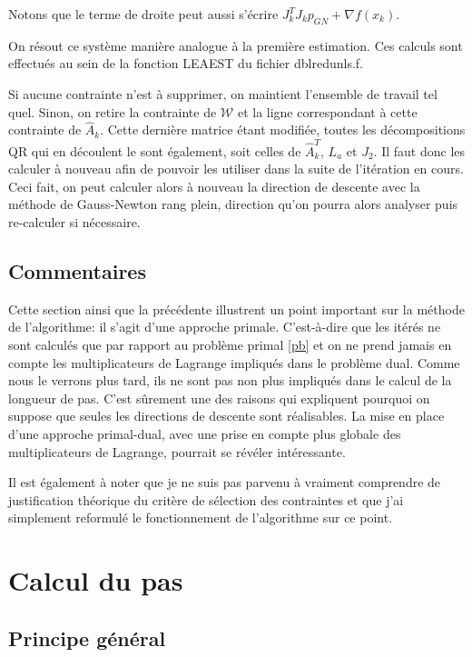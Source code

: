 \documentclass[a4paper,11pt]{article}
\newcommand{\ha}{\hat{A}}
\numberwithin{equation}{section}
\begin{document}
Notons que le terme de droite peut aussi s'écrire $J_{k}^{T}J_{k}p_{GN} + \nabla f(x_{k})$.

On résout ce système manière analogue à la première estimation. Ces calculs sont effectués au sein de la fonction LEAEST du fichier dblredunls.f.


Si aucune contrainte n'est à supprimer, on maintient l'ensemble de travail tel quel. Sinon, on retire la contrainte de $\mathcal{W}$ et la ligne correspondant à cette contrainte de $\ha_{k}$. Cette dernière matrice étant modifiée, toutes les décompositions QR qui en découlent le sont également, soit celles de $\ha_{k}^{T}$, $L_{a}$ et $J_{2}$. Il faut donc les calculer à nouveau afin de pouvoir les utiliser dans la suite de l'itération en cours. Ceci fait, on peut calculer alors à nouveau la direction de descente avec la méthode de Gauss-Newton rang plein, direction qu'on pourra alors analyser puis re-calculer si nécessaire.

\subsection{Commentaires}

Cette section ainsi que la précédente illustrent un point important sur la méthode de l'algorithme: il s'agit d'une approche primale. C'est-à-dire que les itérés ne sont calculés que par rapport au problème primal \ref{pb} et on ne prend jamais en compte les multiplicateurs de Lagrange impliqués dans le problème dual. Comme nous le verrons plus tard, ils ne sont pas non plus impliqués dans le calcul de la longueur de pas. C'est sûrement une des raisons qui expliquent pourquoi on suppose que seules les directions de descente sont réalisables. La mise en place d'une approche primal-dual, avec une prise en compte plus globale des multiplicateurs de Lagrange, pourrait se révéler intéressante.

Il est également à noter que je ne suis pas parvenu à vraiment comprendre de justification théorique du critère de sélection des contraintes et que j'ai simplement reformulé le fonctionnement de l'algorithme sur ce point.

\section{Calcul du pas}

\subsection{Principe général}
\end{document}
